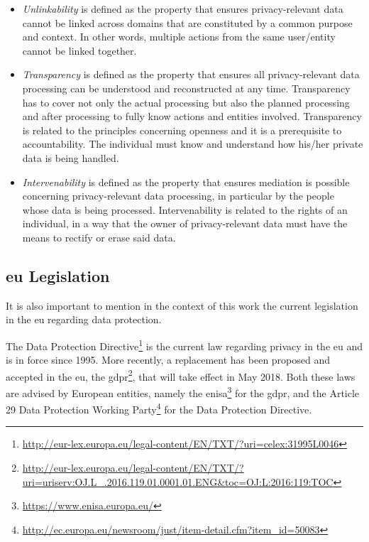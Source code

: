 \begin{itemize}

\item \textit{Unlinkability} is defined as the property that ensures privacy-relevant data cannot be linked across domains that are constituted by a common purpose and context. In other words, multiple actions from the same user/entity cannot be linked together.

\item \textit{Transparency} is defined as the property that ensures all privacy-relevant data processing can be understood and reconstructed at any time. Transparency has to cover not only the actual processing but also the planned processing and after processing to fully know actions and entities involved. Transparency is related to the principles concerning openness and it is a prerequisite to accountability. The individual must know and understand how his/her private data is being handled.

\item \textit{Intervenability} is defined as the property that ensures mediation is possible concerning privacy-relevant data processing, in particular by the people whose data is being processed. Intervenability is related to the rights of an individual, in a way that the owner of privacy-relevant data must have the means to rectify or erase said data.

\end{itemize}


\subsection{\acl{eu} Legislation}
\label{ssec:EuropeanUnionLegislation}

It is also important to mention in the context of this work the current legislation in the \ac{eu} regarding data protection.

 The Data Protection Directive\footnote{\url{http://eur-lex.europa.eu/legal-content/EN/TXT/?uri=celex:31995L0046}} is the current law regarding privacy in the \ac{eu} and is in force since 1995.
More recently, a replacement has been proposed and accepted in the \ac{eu}, the \ac{gdpr}\footnote{\url{http://eur-lex.europa.eu/legal-content/EN/TXT/?uri=uriserv:OJ.L_.2016.119.01.0001.01.ENG&toc=OJ:L:2016:119:TOC}}, that will take effect in May 2018. Both these laws are advised by European entities, namely the \ac{enisa}\footnote{\url{https://www.enisa.europa.eu/}} for the \ac{gdpr}, and the Article 29 Data Protection Working Party\footnote{\url{http://ec.europa.eu/newsroom/just/item-detail.cfm?item_id=50083}} for the Data Protection Directive.


